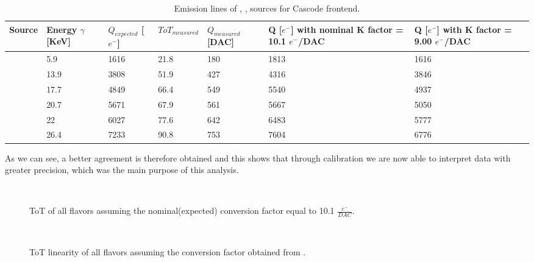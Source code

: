 \begin{table}[h!]
\centering
\begin{tabular}{>{} C{1.8cm}|C{1.8cm}|C{1.8cm}|C{1.8cm}|C{1.8cm}|C{1.8cm}|C{1.8cm}}
Source & Energy $\gamma$ [KeV] & $Q_{expected}$ [$e^{-}$] & $ToT_{measured}$ & $Q_{measured}$ [DAC] & Q [$e^{-}$] \footnotesize{with nominal K factor = 10.1 $e^{-}$/DAC} & Q [$e^{-}$] \footnotesize{with  K factor = 9.00 $e^{-}$/DAC}\\[2ex]
\hline
{} & 5.9 & 1616 & 21.8 & 180 & 1813 & 1616 \\[0.5ex]
\hline
{} & 13.9 & 3808 & 51.9 & 427 & 4316 & 3846 \\[0.5ex]
\hline
{} & 17.7 & 4849 & 66.4 & 549 & 5540 & 4937 \\[0.5ex]
\hline
{} & 20.7 & 5671 & 67.9 & 561 & 5667 & 5050 \\[0.5ex]
\hline
{} & 22 & 6027 & 77.6 & 642 & 6483 & 5777 \\[0.5ex]
\hline
{} & 26.4 & 7233 & 90.8 & 753 & 7604 & 6776 \\[0.5ex]
\hline
\end{tabular}
\caption{Emission lines of , ,  sources for Cascode frontend.}
\label{tab:source_conv_casc}
\end{table}



As we can see, a better agreement is therefore obtained and this shows that through calibration we are now able to interpret data with greater precision, which was the main purpose of this analysis.

\begin{figure}
\centering
{}\quad
{}\\
\caption{ToT of all flavors assuming the nominal(expected) conversion factor equal to 10.1 $\frac{e^{-}}{DAC}$.}
\label{fig:inj_cap_10}
\end{figure} 


\begin{figure}[h!]
\centering
{}\quad
{}\\
\caption{ToT linearity of all flavors assuming the conversion factor obtained from .}
\label{fig:inj_cap_sources}
\end{figure} 




